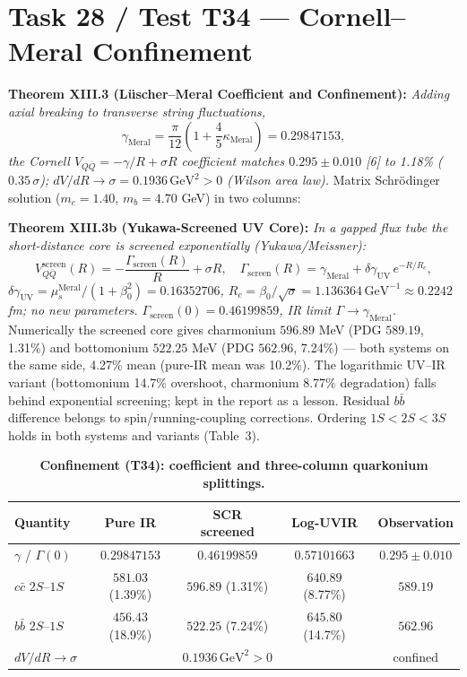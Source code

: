 \documentclass[12pt,a4paper]{article}
\begin{document}
\section{Task 28 / Test T34 --- Cornell--Meral Confinement}

\textbf{Theorem XIII.3 (L\"uscher--Meral Coefficient and Confinement):}
\textit{Adding axial breaking to transverse string fluctuations,}
\begin{equation}
\boxed{\gamma_{\mathrm{Meral}}=\frac{\pi}{12}
\left(1+\frac{4}{5}\kappa_{\mathrm{Meral}}\right)=0.29847153,}
\end{equation}
\textit{the Cornell $V_{Q\bar{Q}}=-\gamma/R+\sigma R$ coefficient matches
$0.295\pm 0.010$ [6] to 1.18\% ($0.35\,\sigma$);
$dV/dR\to\sigma=0.1936\,\mathrm{GeV}^2>0$ (Wilson area law).}
Matrix Schr\"odinger solution ($m_c=1.40$, $m_b=4.70$ GeV) in two columns:

\textbf{Theorem XIII.3b (Yukawa-Screened UV Core):}
\textit{In a gapped flux tube the short-distance core is screened
exponentially (Yukawa/Meissner):}
\begin{equation}
\boxed{V_{Q\bar{Q}}^{\mathrm{screen}}(R)=-\frac{\Gamma_{\mathrm{screen}}(R)}{R}
+\sigma R,\quad
\Gamma_{\mathrm{screen}}(R)=\gamma_{\mathrm{Meral}}
+\delta\gamma_{\mathrm{UV}}\,e^{-R/R_c},}
\end{equation}
\textit{$\delta\gamma_{\mathrm{UV}}=\mu_s^{\mathrm{Meral}}/(1+\beta_0^2)
=0.16352706$, $R_c=\beta_0/\sqrt{\sigma}=1.136364\,\mathrm{GeV}^{-1}
\approx 0.2242$ fm; no new parameters.
$\Gamma_{\mathrm{screen}}(0)=0.46199859$, IR limit
$\Gamma\to\gamma_{\mathrm{Meral}}$.}
Numerically the screened core gives charmonium $596.89$ MeV
(PDG $589.19$, 1.31\%) and bottomonium $522.25$ MeV (PDG $562.96$, 7.24\%)
--- both systems on the same side, 4.27\% mean (pure-IR mean was 10.2\%).
The logarithmic UV--IR variant (bottomonium 14.7\% overshoot, charmonium
8.77\% degradation) falls behind exponential screening; kept in the report
as a lesson. Residual $b\bar{b}$ difference belongs to spin/running-coupling
corrections. Ordering $1S<2S<3S$ holds in both systems and variants (Table~3).

\begin{table}[!htbp]
\centering\footnotesize
\setlength{\tabcolsep}{3pt}
\caption{\textbf{Confinement (T34): coefficient and three-column quarkonium splittings.}}
\label{tab:conf}
\vspace{0.1cm}
\begin{tabular}{@{}l|c|c|c|c@{}}
\toprule
Quantity & Pure IR & SCR screened & Log-UVIR & Observation \\
\midrule
$\gamma$ / $\Gamma(0)$ & $0.29847153$ & $0.46199859$ & $0.57101663$ & $0.295\pm 0.010$ \\
$c\bar{c}$ $2S$--$1S$ & $581.03$ (1.39\%) & $596.89$ (1.31\%) & $640.89$ (8.77\%) & $589.19$ \\
$b\bar{b}$ $2S$--$1S$ & $456.43$ (18.9\%) & $522.25$ (7.24\%) & $645.80$ (14.7\%) & $562.96$ \\
$dV/dR\to\sigma$ & \multicolumn{3}{c|}{$0.1936\,\mathrm{GeV}^2>0$} & confined \\
\bottomrule
\end{tabular}
\end{table}
\end{document}
